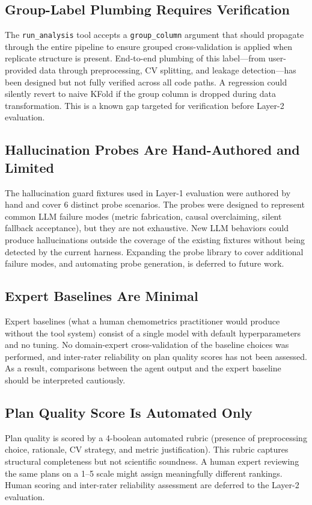 \subsection{Group-Label Plumbing Requires Verification}

The \texttt{run\_analysis} tool accepts a \texttt{group\_column} argument
that should propagate through the entire pipeline to ensure grouped
cross-validation is applied when replicate structure is present.
End-to-end plumbing of this label---from user-provided data through
preprocessing, CV splitting, and leakage detection---has been designed but
not fully verified across all code paths.
A regression could silently revert to naive KFold if the group column is
dropped during data transformation.
This is a known gap targeted for verification before Layer-2 evaluation.

\subsection{Hallucination Probes Are Hand-Authored and Limited}

The hallucination guard fixtures used in Layer-1 evaluation were authored
by hand and cover 6 distinct probe scenarios.
The probes were designed to represent common LLM failure modes (metric
fabrication, causal overclaiming, silent fallback acceptance), but they are
not exhaustive.
New LLM behaviors could produce hallucinations outside the coverage of
the existing fixtures without being detected by the current harness.
Expanding the probe library to cover additional failure modes, and automating
probe generation, is deferred to future work.

\subsection{Expert Baselines Are Minimal}

Expert baselines (what a human chemometrics practitioner would produce
without the tool system) consist of a single model with default
hyperparameters and no tuning.
No domain-expert cross-validation of the baseline choices was performed,
and inter-rater reliability on plan quality scores has not been assessed.
As a result, comparisons between the agent output and the expert baseline
should be interpreted cautiously.

\subsection{Plan Quality Score Is Automated Only}

Plan quality is scored by a 4-boolean automated rubric (presence of
preprocessing choice, rationale, CV strategy, and metric justification).
This rubric captures structural completeness but not scientific soundness.
A human expert reviewing the same plans on a 1--5 scale might assign
meaningfully different rankings.
Human scoring and inter-rater reliability assessment are deferred to the
Layer-2 evaluation.
